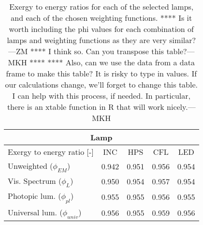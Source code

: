 

\begin{table}
\centering %
\caption{Exergy to energy ratios for each of the selected lamps, and each of the chosen weighting functions. **** Is it worth including the phi values for each combination of lamps and weighting functions as they are very similar? ---ZM ****
I think so. Can you transpose this table?---MKH ****
**** Also, can we use the data from a data frame to make this table?
It is risky to type in values. If our calculations change, we'll forget to change this table.
I can help with this process, if needed.  
In particular, there is an xtable function in R that will work nicely.---MKH}
\begin{tabular}{l c c c c}
\toprule
\multicolumn{5}{c}{Lamp} \\
\midrule
  Exergy to energy ratio [-]
  & INC 
  & HPS
  & CFL 
  & LED \\
\midrule
  Unweighted ($\phi_{EM}$) & 0.942 & 0.951 & 0.956 & 0.954 \\
  Vis. Spectrum ($\phi_{L}$) & 0.950 & 0.954 & 0.957 & 0.954 \\
  Photopic lum. ($\phi_{pl}$) & 0.955 & 0.955 & 0.956 & 0.955 \\
  Universal lum. ($\phi_{univ}$) & 0.956 & 0.955 & 0.959 & 0.956 \\
\bottomrule
\end{tabular}
\label{tab:results_phi}
\end{table}